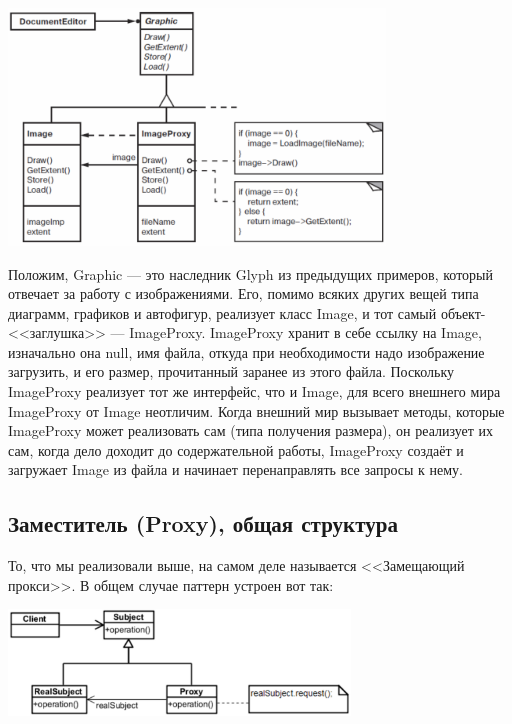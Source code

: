\documentclass{../mcstext}
\begin{document}
\begin{center}
    \includegraphics[width=0.75\textwidth]{proxyExampleClassDiagram.png}
\end{center}

Положим, Graphic --- это наследник Glyph из предыдущих примеров, который отвечает за работу с изображениями. Его, помимо всяких других вещей типа диаграмм, графиков и автофигур, реализует класс Image, и тот самый объект-<<заглушка>> --- ImageProxy. ImageProxy хранит в себе ссылку на Image, изначально она null, имя файла, откуда при необходимости надо изображение загрузить, и его размер, прочитанный заранее из этого файла. Поскольку ImageProxy реализует тот же интерфейс, что и Image, для всего внешнего мира ImageProxy от Image неотличим. Когда внешний мир вызывает методы, которые ImageProxy может реализовать сам (типа получения размера), он реализует их сам, когда дело доходит до содержательной работы, ImageProxy создаёт и загружает Image из файла и начинает перенаправлять все запросы к нему.

\subsection{Заместитель (Proxy), общая структура}

То, что мы реализовали выше, на самом деле называется <<Замещающий прокси>>. В общем случае паттерн устроен вот так:

\begin{center}
    \includegraphics[width=0.68\textwidth]{proxy.png}
\end{center}
\end{document}
